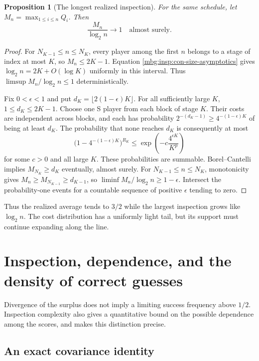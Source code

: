 \documentclass[11pt,letterpaper]{article}
\newtheorem{proposition}[theorem]{Proposition}
\theoremstyle{definition}
\begin{document}
\begin{proposition}[The longest realized inspection]\label{mbg:insp:con-max-cost}
For the same schedule, let $M_n=\max_{1\leq i\leq n}Q_i$.  Then
\[
 \frac{M_n}{\log_2 n}\longrightarrow1
 \quad\text{almost surely}.
\]
\end{proposition}

\begin{proof}
For $N_{K-1}\leq n\leq N_K$, every player among the first $n$ belongs to
a stage of index at most $K$, so $M_n\leq2K-1$.  Equation
\eqref{mbg:insp:con-size-asymptotics} gives $\log_2 n=2K+O(\log K)$ uniformly in
this interval.  Thus $\limsup M_n/\log_2 n\leq1$ deterministically.

Fix $0<\epsilon<1$ and put $d_K=\lfloor2(1-\epsilon)K\rfloor$.
For all sufficiently large $K$, $1\leq d_K\leq2K-1$.  Choose one S player
from each block of stage $K$.  Their costs are independent across blocks,
and each has probability $2^{-(d_K-1)}\geq4^{-(1-\epsilon)K}$ of being at
least $d_K$.  The probability that none reaches $d_K$ is consequently at
most
\[
 \bigl(1-4^{-(1-\epsilon)K}\bigr)^{R_K}
 \leq\exp\!\left(-c\frac{4^{\epsilon K}}{K^p}\right)
\]
for some $c>0$ and all large $K$.  These probabilities are summable.
Borel--Cantelli implies $M_{N_K}\geq d_K$ eventually, almost surely.
For $N_{K-1}\leq n\leq N_K$, monotonicity gives
$M_n\geq M_{N_{K-1}}\geq d_{K-1}$, so
$\liminf M_n/\log_2 n\geq1-\epsilon$.  Intersect the probability-one
events for a countable sequence of positive $\epsilon$ tending to zero.
\end{proof}

Thus the realized average tends to $3/2$ while the largest inspection grows
like $\log_2 n$.  The cost distribution has a uniformly light tail, but its
support must continue expanding along the line.


\section{Inspection, dependence, and the density of correct guesses}
\label{mbg:insp:var-section}

Divergence of the surplus does not imply a limiting success frequency
above $1/2$.  Inspection complexity also gives a quantitative bound on
the possible dependence among the scores, and makes this distinction
precise.

\subsection{An exact covariance identity}
\end{document}
